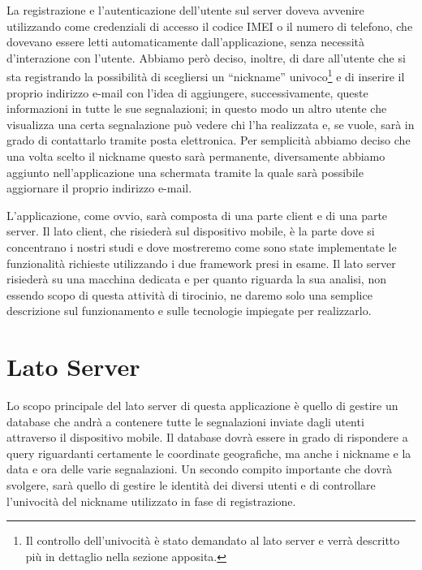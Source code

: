     \noindent La registrazione e l'autenticazione dell'utente sul server doveva avvenire
    utilizzando come credenziali di accesso il codice IMEI o il numero di
    telefono, che dovevano essere letti automaticamente dall'applicazione,
    senza necessità d'interazione con l'utente. Abbiamo però deciso, inoltre, di
    dare all'utente che si sta registrando la possibilità di scegliersi un
    ``nickname'' univoco\footnote{Il controllo dell'univocità è stato demandato
    al lato server e verrà descritto più in dettaglio nella sezione apposita.}
    e di inserire il proprio indirizzo e-mail con l'idea di aggiungere,
    successivamente, queste informazioni in tutte le sue segnalazioni; in questo
    modo un altro utente che visualizza una certa segnalazione può vedere chi
    l'ha realizzata e, se vuole, sarà in grado di contattarlo tramite posta
    elettronica. Per semplicità abbiamo deciso che una volta scelto il nickname
    questo sarà permanente, diversamente abbiamo aggiunto nell'applicazione una
    schermata tramite la quale sarà possibile aggiornare il proprio indirizzo
    e-mail.

    L'applicazione, come ovvio, sarà composta di una parte client e di una parte
    server. Il lato client, che risiederà sul dispositivo mobile, è la parte dove
    si concentrano i nostri studi e dove
    mostreremo come sono state implementate le funzionalità richieste
    utilizzando i due frame\-work presi in esame. Il lato server risiederà
    su una macchina dedicata e per quanto riguarda la sua analisi, non
    essendo scopo di questa attività di tirocinio, ne daremo solo una
    semplice descrizione sul funzionamento e sulle tecnologie
    impiegate per realizzarlo.

    \section{Lato Server}
        Lo scopo principale del lato server di questa applicazione è quello di
        gestire un database che andrà a contenere tutte le segnalazioni inviate
        dagli utenti attraverso il dispositivo mobile. Il
        database dovrà essere in grado di rispondere a query riguardanti
        certamente le coordinate geografiche, ma anche i nickname e la data e
        ora delle varie segnalazioni. Un secondo compito importante che dovrà
        svolgere, sarà quello di gestire le identità dei diversi utenti e di
        controllare l'univocità del nickname utilizzato in fase di
        registrazione.

